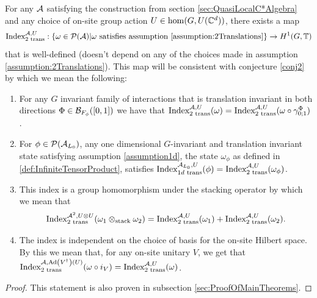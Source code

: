 \documentclass[11pt,a4paper,twoside]{article}
\numberwithin{equation}{section}
\begin{document}
	\begin{theorem}\label{thrm:ExistenceSecondIndex}
		For any $\AA$ satisfying the construction from section \ref{sec:QuasiLocalC*Algebra} and any choice of on-site group action $U\in\hom(G,U(\CC^d))$, there exists a map
		\begin{equation}
			\textrm{Index}^{\AA,U}_{2\text{ trans}}:\{\omega\in\PP(\AA)| \omega\text{ satisfies assumption \ref{assumption:2Translations}}\}\rightarrow H^1(G,\TT)
		\end{equation}
		that is well-defined (doesn't depend on any of the choices made in assumption \ref{assumption:2Translations}). This map will be consistent with conjecture \ref{conj2} by which we mean the following:
		\begin{enumerate}
			\item For any $G$ invariant family of interactions that is translation invariant in both directions $\Phi\in\BB_{F_\phi}([0,1])$ we have that $\textrm{Index}^{\AA,U}_{2\text{ trans}}(\omega)=\textrm{Index}^{\AA,U}_{2\text{ trans}}(\omega\circ\gamma^\Phi_{0;1})$.
			\item For $\phi\in\PP(\AA_{L_0})$, any one dimensional $G$-invariant and translation invariant state satisfying assumption \ref{assumption1d}, the state $\omega_\phi$ as defined in \ref{def:InfiniteTensorProduct}, satisfies $\textrm{Index}^{\AA_{L_0},U}_{1d\text{ trans}}(\phi)=\text{Index}^{\AA,U}_{2\text{ trans}}(\omega_\phi)$.
			\item This index is a group homomorphism under the stacking operator by which we mean that
			\begin{equation}
				\textrm{Index}_{\text{2 trans}}^{\AA^2,U\otimes U}(\omega_1\otimes_{\text{stack}}\omega_2)=\textrm{Index}_{\text{2 trans}}^{\AA,U}(\omega_1)+\textrm{Index}_{\text{2 trans}}^{\AA,U}(\omega_2).
			\end{equation}
			\item The index is independent on the choice of basis for the on-site Hilbert space. By this we mean that, for any on-site unitary $V$, we get that $\textrm{Index}^{\AA,\Ad{V^\dagger}(U)}_{\text{2 trans}}(\omega\circ i_V) =\textrm{Index}^{\AA,U}_{\text{2 trans}}(\omega)$.
		\end{enumerate}
	\end{theorem}
	\begin{proof}
		This statement is also proven in subsection \ref{sec:ProofOfMainTheorems}.
	\end{proof}
\end{document}
